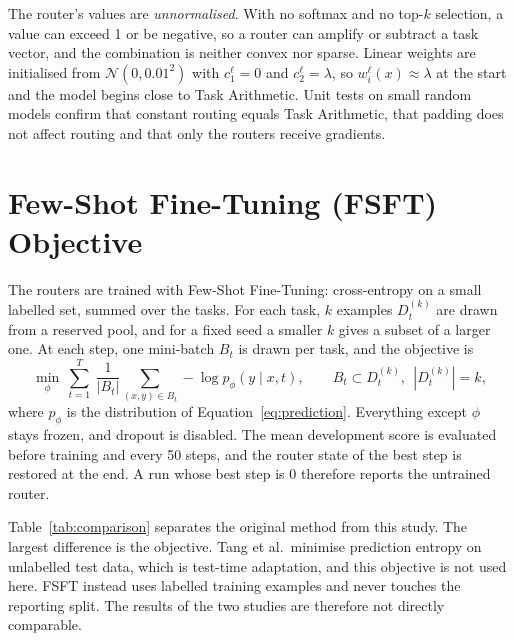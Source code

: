 The router's values are \emph{unnormalised}. With no softmax and no top-$k$ selection, a value can exceed 1 or be negative, so a router can amplify or subtract a task vector, and the combination is neither convex nor sparse. Linear weights are initialised from $\mathcal{N}(0,0.01^2)$ with $c^{\ell}_1=0$ and $c^{\ell}_2=\lambda$, so $w^{\ell}_i(x)\approx\lambda$ at the start and the model begins close to Task Arithmetic. Unit tests on small random models confirm that constant routing equals Task Arithmetic, that padding does not affect routing and that only the routers receive gradients.

\section{Few-Shot Fine-Tuning (FSFT) Objective}
\label{sec:fsft}

The routers are trained with Few-Shot Fine-Tuning: cross-entropy on a small labelled set, summed over the tasks. For each task, $k$ examples $D_t^{(k)}$ are drawn from a reserved pool, and for a fixed seed a smaller $k$ gives a subset of a larger one. At each step, one mini-batch $B_t$ is drawn per task, and the objective is
\begin{equation}
\min_{\phi}\ \sum_{t=1}^{T}\ \frac{1}{|B_t|}\sum_{(x,y)\in B_t}-\log p_{\phi}(y\mid x,t),
\qquad B_t\subset D_t^{(k)},\ \ |D_t^{(k)}|=k ,
\label{eq:fsft}
\end{equation}
where $p_\phi$ is the distribution of Equation~\eqref{eq:prediction}. Everything except $\phi$ stays frozen, and dropout is disabled. The mean development score is evaluated before training and every 50 steps, and the router state of the best step is restored at the end. A run whose best step is 0 therefore reports the untrained router.

Table~\ref{tab:comparison} separates the original method from this study. The largest difference is the objective. Tang et al.\ minimise prediction entropy on unlabelled test data, which is test-time adaptation, and this objective is not used here. FSFT instead uses labelled training examples and never touches the reporting split. The results of the two studies are therefore not directly comparable.

